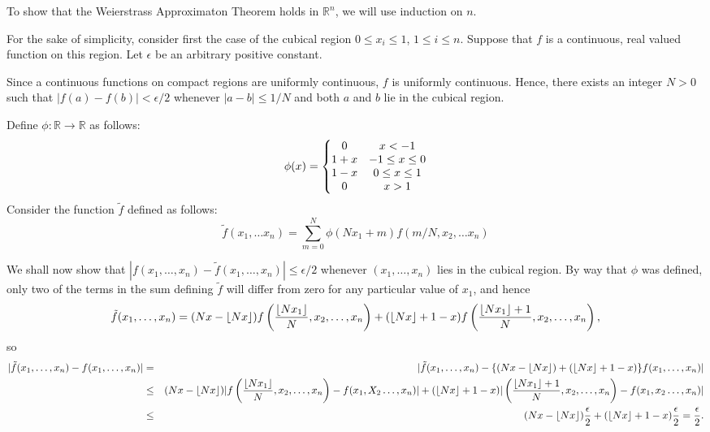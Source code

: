 \documentclass[12pt]{article}
\begin{document}
To show that the Weierstrass Approximaton Theorem holds in
$\mathbb{R}^n$, we will use induction on $n$.

For the sake of simplicity, consider first the case of the cubical
region $0 \le x_i \le 1$, $1 \le i \le n$.  Suppose that $f$ is a
continuous, real valued function on this region.  Let $\epsilon$ be an
arbitrary positive constant.

Since a continuous functions on compact regions are uniformly
continuous, $f$ is uniformly continuous.  Hence, there exists an
integer $N > 0$ such that $|f(a) - f(b)| < \epsilon/2$ whenever $|a -
b| \le 1/N$ and both $a$ and $b$ lie in the cubical region.

Define $\phi \colon \mathbb{R} \to \mathbb{R}$ as follows: 
\[ \phi (x) = \left\{ \begin{matrix} 0 & x < -1 \cr 1 + x & -1
\le x \le 0 \cr 1 - x & 0 \le x \le 1 \cr 0 & x > 1\end{matrix}
\right. \]
Consider the function ${\tilde f}$ defined as follows: 
\[ {\tilde f} (x_1, \ldots x_n) = \sum_{m = 0}^N \phi(N x_1 + m)
f(m/N, x_2, \ldots x_n) \]

We shall now show that $|f(x_1, \ldots, x_n) - {\tilde f}(x_1, \ldots,
x_n)| \le \epsilon/2$ whenever $(x_1, \ldots, x_n)$ lies in the
cubical region.  By way that $\phi$ was defined, only two of the terms
in the sum defining ${\tilde f}$ will differ from zero for any
particular value of $x_1$, and hence 
\[ {\tilde f} (x_1, \ldots, x_n) = (Nx - \lfloor Nx \rfloor) f \left(
{\lfloor N x_1 \rfloor \over N}, x_2, \ldots, x_n \right) + (\lfloor
Nx \rfloor + 1 - x) f \left( {\lfloor N x_1 \rfloor + 1 \over N}, x_2,
\ldots, x_n \right), \]
so
\begin{eqnarray*}
| {\tilde f} (x_1, \ldots, x_n) - f (x_1, \ldots, x_n) | &=&
| {\tilde f} (x_1, \ldots, x_n) - \{ (Nx - \lfloor Nx \rfloor) + 
(\lfloor Nx \rfloor + 1 - x)\} f (x_1, \ldots, x_n) | \cr
&\le& (Nx - \lfloor Nx \rfloor) | f \left( {\lfloor N x_1 \rfloor \over
N}, x_2, \ldots, x_n \right) -  f (x_1, X_2 \ldots, x_n) | +
(\lfloor Nx \rfloor + 1 - x) |\left( {\lfloor N x_1 \rfloor + 1 \over N}, x_2,
\ldots, x_n \right) -  f (x_1, x_2 \ldots, x_n) | \cr
&\le& (Nx - \lfloor Nx \rfloor) {\epsilon \over 2} + 
(\lfloor Nx \rfloor + 1 - x) {\epsilon \over 2} = {\epsilon \over 2}.
\end{eqnarray*}
\end{document}
